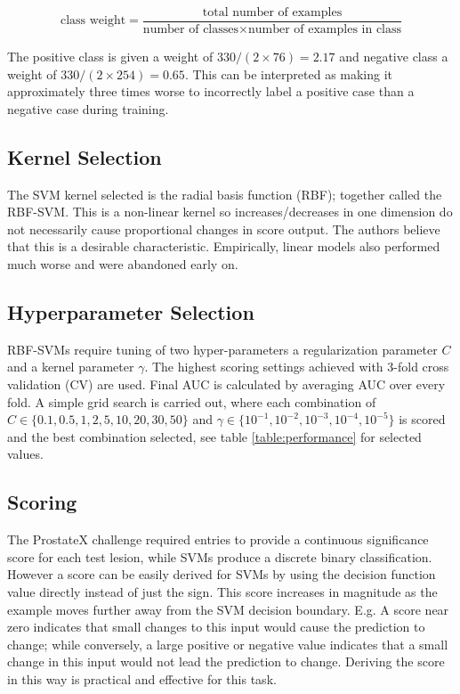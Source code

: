 \documentclass[a4paper]{spie}
\begin{document}
\begin{equation}
\text{class weight} =
\frac
    {\text{total number of examples}}
    {\text{number of classes} \times \text{number of examples in class}}
\end{equation}
    
The positive class is given a weight of $ 330 / (2 \times 76) =  2.17 $ and negative class a weight of $ 330 / (2 \times 254) = 0.65 $. This can be interpreted as making it approximately three times worse to incorrectly label a positive case than a negative case during training.

\subsection{Kernel Selection}

The SVM kernel selected is the radial basis function (RBF); together called the RBF-SVM. This is a non-linear kernel so increases/decreases in one dimension do not necessarily cause proportional changes in score output. The authors believe that this is a desirable characteristic. Empirically, linear models also performed much worse and were abandoned early on.

\subsection{Hyperparameter Selection}

RBF-SVMs require tuning of two hyper-parameters a regularization parameter $C$ and a kernel parameter $\gamma$. The highest scoring settings achieved with 3-fold cross validation\cite{Hastie2009} (CV) are used. Final AUC is calculated by averaging AUC over every fold. A simple grid search is carried out, where each combination of $C \in \{0.1, 0.5, 1, 2, 5, 10, 20, 30, 50\}$ and $\gamma \in \{10^{-1}, 10^{-2}, 10^{-3}, 10^{-4}, 10^{-5}\}$ is scored and the best combination selected, see table \ref{table:performance} for selected values.

\subsection{Scoring}

The ProstateX challenge required entries to provide a continuous significance score for each test lesion, while SVMs produce a discrete binary classification. However a score can be easily derived for SVMs by using the decision function value directly instead of just the sign. This score increases in magnitude as the example moves further away from the SVM decision boundary. E.g. A score near zero indicates that small changes to this input would cause the prediction to change; while conversely, a large positive or negative value indicates that a small change in this input would not lead the prediction to change. Deriving the score in this way is practical and effective for this task.
\end{document}
